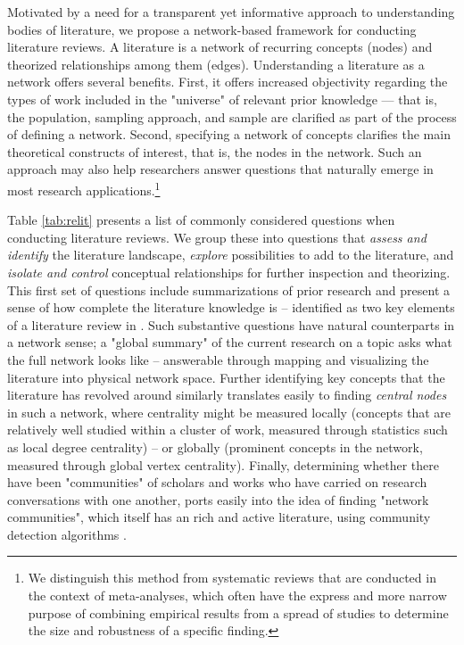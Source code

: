\documentclass{cup-pan}
\begin{document}
Motivated by a need for a transparent yet informative approach to understanding bodies of literature, we propose a network-based framework for conducting literature reviews. A literature is a network of recurring concepts (nodes) and theorized relationships among them (edges). Understanding a literature as a network offers several benefits. First, it offers increased objectivity regarding the types of work included in the "universe" of relevant prior knowledge --- that is, the population, sampling approach, and sample are clarified as part of the process of defining a network. Second, specifying a network of concepts clarifies the main theoretical constructs of interest, that is, the nodes in the network. Such an approach may also help researchers answer questions that naturally emerge in most research applications.\footnote{We distinguish this method from systematic reviews that are conducted in the context of meta-analyses, which often have the express and more narrow purpose of combining empirical results from a spread of studies to determine the size and robustness of a specific finding.} \par 

Table \ref{tab:relit} presents a list of commonly considered questions when conducting literature reviews. We group these into questions that \textit{assess and identify} the literature landscape, \textit{explore} possibilities to add to the literature, and \textit{isolate and control} conceptual relationships for further inspection and theorizing. This first set of questions include summarizations of prior research and present a sense of how complete the literature knowledge is -- identified as two key elements of a literature review in \citet{knopf_doing_2006}. Such substantive questions have natural counterparts in a network sense; a "global summary" of the current research on a topic asks what the full network looks like -- answerable through mapping and visualizing the literature into physical network space. Further identifying key concepts that the literature has revolved around similarly translates easily to finding \textit{central nodes} in such a network, where centrality might be measured locally (concepts that are relatively well studied within a cluster of work, measured through statistics such as local degree centrality) -- or globally (prominent concepts in the network, measured through global vertex centrality). Finally, determining whether there have been "communities" of scholars and works who have carried on research conversations with one another, ports easily into the idea of finding "network communities", which itself has an rich and active literature, using community detection algorithms \citep[see for a review][]{yang_comparative_2016}.\par 
\end{document}
